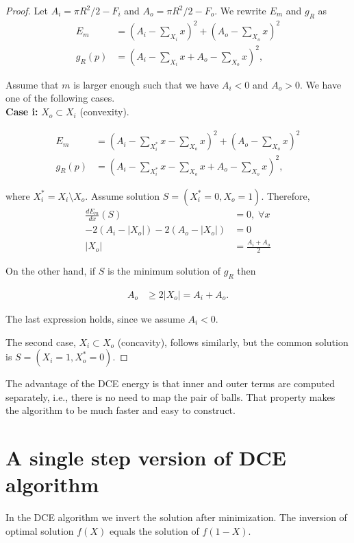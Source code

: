 \begin{proof}
	Let $A_i=\pi R^2/2 - F_i$ and $A_o=\pi R^2/2 -F_o$. We rewrite $E_m$ and $g_R$ as
	\begin{align*}
		E_m &= (A_i - \sum_{X_i}{x} )^2 + (A_o - \sum_{X_o}{x})^2\\
		g_R(p) &= (A_i - \sum_{X_i}{x} + A_o - \sum_{X_o}{x})^2,
	\end{align*}
	
	Assume that $m$ is larger enough such that we have $A_i<0$ and $A_o>0$. We have one of the following cases.\\
	
	\textbf{Case i:} $X_o \subset X_i$ (convexity).
	
	\begin{align*}
		E_m &= (A_i - \sum_{X_i^*}{x} - \sum_{X_o}{x} )^2 + (A_o - \sum_{X_o}{x})^2\\
		g_R(p) &= (A_i - \sum_{X_i^*}{x} - \sum_{X_o}{x} + A_o - \sum_{X_o}{x})^2,
	\end{align*}	
	
	where $X_i^*=X_i \setminus X_o$. Assume solution $S=(X_i^*=0,X_o=1)$. Therefore,
	\begin{align*}
		\frac{dE_m}{dx}(S) &= 0, \; \forall x \\
		-2(A_i - |X_o|) - 2(A_o - |X_o|) &= 0 \\
		|X_o| &= \frac{A_i+A_o}{2}
	\end{align*}
	
	On the other hand, if $S$ is the minimum solution of $g_R$ then
	
	\begin{align*}
		A_o &\geq 2|X_o| = A_i+A_o.
	\end{align*}
	
	The last expression holds, since we assume $A_i<0$.
	
	The second case, $X_i \subset X_o$ (concavity), follows similarly, but the common solution is $S=(X_i=1,X_o^*=0)$.
\end{proof}

The advantage of the DCE energy is that inner and outer terms are computed separately, i.e., there is no need to map the pair of balls. That property makes the algorithm to be much faster and easy to construct.

\section{A single step version of DCE algorithm}
In the DCE algorithm we invert the solution after minimization. The inversion of optimal solution $f(X)$ equals the solution of $f(1-X)$.

